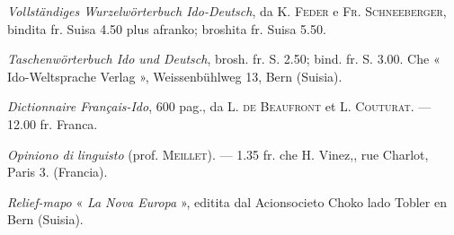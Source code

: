 \begin{VUpage}[238]{}
\textit{Vollständiges Wurzelwörterbuch Ido-Deutsch}, da K. \textsc{Feder} e\nl
\textsc{Fr. Schneeberger}, bindita fr. Suisa 4.50 plus afranko; broshita\nl
fr. Suisa 5.50.

\textit{Taschenwörterbuch Ido und Deutsch}, brosh. fr. S. 2.50; bind.\nl
fr. S. 3.00. Che « Ido-Weltsprache Verlag », Weissenbühlweg 13,\nl
Bern (Suisia).

\textit{Dictionnaire Français-Ido}, 600 pag., da L. \textsc{de Beaufront} et\nl
L. \textsc{Couturat}. --- 12.00 fr. Franca.

\textit{Opiniono di linguisto} (prof. \textsc{Meillet}). --- 1.35 fr. che H. Vinez,, rue Charlot, Paris 3. (Francia).

\textit{Relief-mapo} « \textit{La Nova Europa} », editita dal Acionsocieto Choko\cc
lado Tobler en Bern (Suisia).
\end{VUpage}
